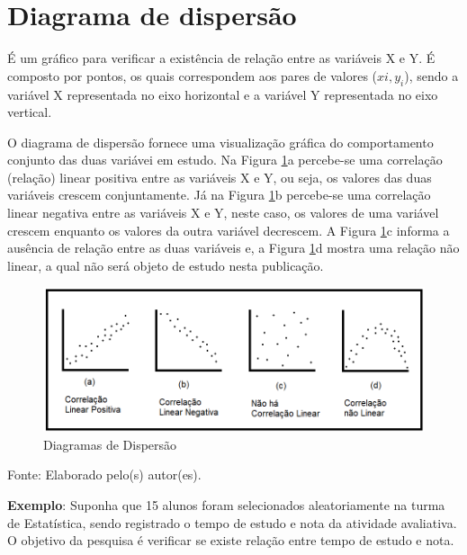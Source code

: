\documentclass[12pt,brazil,oneside]{book}
\begin{document}
\hypertarget{diagrama-de-dispersao}{%
\section{Diagrama de dispersão}\label{diagrama-de-dispersao}}

É um gráfico para verificar a existência de relação entre as variáveis X e Y. É composto por pontos, os quais correspondem aos pares de valores (\(xi, y_i\)), sendo a variável X representada no eixo horizontal e a variável Y representada no eixo vertical.

O diagrama de dispersão fornece uma visualização gráfica do comportamento conjunto das duas variávei em estudo. Na Figura \ref{fig:diag}a percebe-se uma correlação (relação) linear positiva entre as variáveis X e Y, ou seja, os valores das duas variáveis crescem conjuntamente. Já na Figura \ref{fig:diag}b percebe-se uma correlação linear negativa entre as variáveis X e Y, neste caso, os valores de uma variável crescem enquanto os valores da outra variável decrescem. A Figura \ref{fig:diag}c informa a ausência de relação entre as duas variáveis e, a Figura \ref{fig:diag}d mostra uma relação não linear, a qual não será objeto de estudo nesta publicação.

\begin{figure}[H]

{\centering \includegraphics[width=0.7\linewidth]{correlacao1} 

}

\caption{Diagramas de Dispersão}\label{fig:diag}
\end{figure}

Fonte: Elaborado pelo(s) autor(es).

\textbf{Exemplo}: Suponha que 15 alunos foram selecionados aleatoriamente na turma de Estatística, sendo registrado o tempo de estudo e nota da atividade avaliativa. O objetivo da pesquisa é verificar se existe relação entre tempo de estudo e nota.
\end{document}
